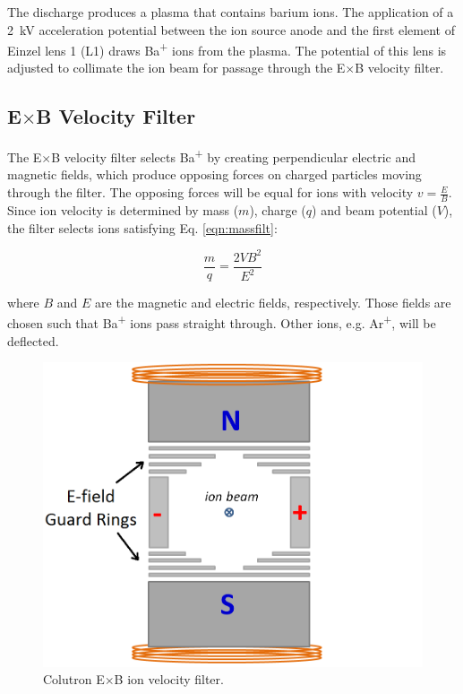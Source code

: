 The discharge produces a plasma that contains barium ions.  The application of a 2~kV acceleration potential between the ion source anode and the first element of Einzel lens 1 (L1) draws Ba\textsuperscript{+} ions from the plasma.  The potential of this lens is adjusted to collimate the ion beam for passage through the E$\times$B velocity filter.


\subsection{E$\times$B Velocity Filter}

The E$\times$B velocity filter selects Ba\textsuperscript{+} by creating perpendicular electric and magnetic fields, which produce opposing forces on charged particles moving through the filter.  The opposing forces will be equal for ions with velocity $v = \frac{E}{B}$.  Since ion velocity is determined by mass ($m$), charge ($q$) and beam potential ($V$), the filter selects ions satisfying Eq. \ref{eqn:massfilt}:

\begin{equation}
\frac{m}{q} = \frac{2 V B^{2}}{E^{2}}
\label{eqn:massfilt}
\end{equation}

\noindent
where $B$ and $E$ are the magnetic and electric fields, respectively.  Those fields are chosen such that Ba\textsuperscript{+} ions pass straight through.  Other ions, e.g. Ar\textsuperscript{+}, will be deflected.  

\begin{figure} %
        \centering
                \includegraphics[width=.6\textwidth]{figures/ExB.png}
                \caption{Colutron E$\times$B ion velocity filter.}
\label{fig:exb}
\end{figure}


